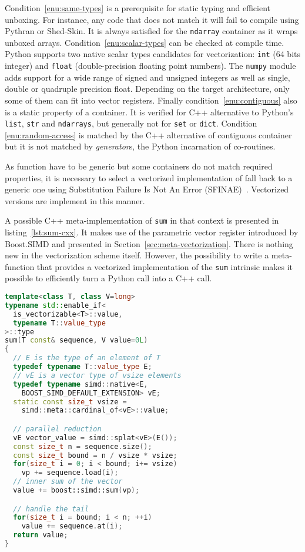 \documentclass[preprint]{sigplanconf}
\begin{document}
Condition~\ref{enu:same-types} is a prerequisite for static typing and efficient
unboxing. For instance, any code that does not match it will fail to compile
using Pythran or Shed-Skin. It is always satisfied for the \texttt{ndarray}
container as it wraps unboxed arrays. Condition~\ref{enu:scalar-types} can be
checked at compile time. Python supports two native scalar types candidates for
vectorization: \texttt{int} (64 bits integer) and \texttt{float}
(double-precision floating point numbers). The \texttt{numpy} module adds support for a
wide range of signed and unsigned integers as well as single, double or
quadruple precision float. Depending on the target architecture, only some of
them can fit into vector registers. Finally condition~\ref{enu:contiguous} also
is a static property of a container. It is verified for C++ alternative to
Python's \texttt{list}, \texttt{str} and \texttt{ndarrays}, but generally not
for \texttt{set} or \texttt{dict}. Condition \ref{enu:random-access} is matched by
the C++ alternative of contiguous container but it is not
matched by \emph{generator}s, the Python incarnation of co-routines.

As function have to be generic but some containers do not match required
properties, it is necessary to select a vectorized implementation of fall back
to a generic one using Substitution Failure Is Not An Error
(SFINAE)~\cite{metaprogramming2002}. Vectorized versions are implement in this manner.

A possible C++ meta-implementation of \texttt{sum} in that context is presented
in listing~\ref{lst:sum-cxx}. It makes use of the parametric vector register
introduced by Boost.SIMD and presented in Section~\ref{sec:meta-vectorization}.
There is nothing new in the vectorization scheme itself. However, the
possibility to write a meta-function that provides a vectorized implementation
of the \texttt{sum} intrinsic makes it possible to efficiently turn a Python
call into a C++ call.

\begin{lstlisting}[language=c++, label={lst:sum-cxx}, caption={Meta-implementation of the \texttt{sum} intrinsic in C++11.}]
template<class T, class V=long>
typename std::enable_if<
  is_vectorizable<T>::value,
  typename T::value_type
>::type
sum(T const& sequence, V value=0L)
{
  // E is the type of an element of T
  typedef typename T::value_type E;
  // vE is a vector type of vsize elements
  typedef typename simd::native<E,
    BOOST_SIMD_DEFAULT_EXTENSION> vE;
  static const size_t vsize =
    simd::meta::cardinal_of<vE>::value;

  // parallel reduction
  vE vector_value = simd::splat<vE>(E());
  const size_t n = sequence.size();
  const size_t bound = n / vsize * vsize;
  for(size_t i = 0; i < bound; i+= vsize)
    vp += sequence.load(i);
  // inner sum of the vector
  value += boost::simd::sum(vp);

  // handle the tail
  for(size_t i = bound; i < n; ++i)
    value += sequence.at(i);
  return value;
}
\end{lstlisting}
\end{document}
